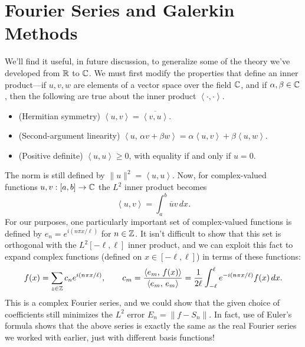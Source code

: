 \documentclass[../m180main.tex]{subfiles}
\begin{document}
\section{Fourier Series and Galerkin Methods}
We'll find it useful, in future discussion, to generalize some of the theory we've developed from $\mathbb{R}$ to $\mathbb{C}$.
We must first modify the properties that define an inner product---if $u,v,w$ are elements of a vector space over the field $\mathbb{C}$, and if $\alpha, \beta \in \mathbb{C}$, then the following are true about the inner product $\left< \cdot, \cdot \right>$.
\begin{itemize}[topsep=0pt]
    \item (Hermitian symmetry) $\left< u,v \right> = \overline{\left< v, u \right>}$.
    \item (Second-argument linearity) $\left< u, \, \alpha v + \beta w \right> = \alpha \left< u, v \right> + \beta \left< u, w \right>$.
    \item (Positive definite) $\left< u, u \right> \geq 0$, with equality if and only if $u = 0$.
\end{itemize}
The norm is still defined by $\| u \|^2 = \left< u,u \right>$.
Now, for complex-valued functions $u,v : [a,b] \to \mathbb{C}$ the $L^2$ inner product becomes
\[ \left< u,v \right> = \int_{a}^{b} \overline u v \,dx. \]
For our purposes, one particularly important set of complex-valued functions is defined by $e_n = e^{i (n\pi x / \ell)}$ for $n \in \mathbb{Z}$.
It isn't difficult to show that this set is orthogonal with the $L^2[-\ell, \ell]$ inner product, and we can exploit this fact to expand complex functions (defined on $x \in [-\ell, \ell]$) in terms of these functions:
\[ f(x) = \sum_{z \in \mathbb{Z}}^{} c_n e^{i (n\pi x / \ell)}, \qquad c_m = \frac{\left< e_m, \, f(x) \right>}{\left< e_m, \, e_m \right>} = \frac{1}{2\ell} \int_{-\ell}^{\ell} e^{-i (n\pi x / \ell)} f(x) \,dx. \]
This is a complex Fourier series, and we could show that the given choice of coefficients still minimizes the $L^2$ error $E_n = \| f - S_n \|$.
In fact, use of Euler's formula shows that the above series is exactly the same as the real Fourier series we worked with earlier, just with different basis functions!
\end{document}
